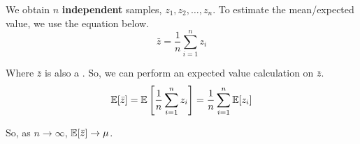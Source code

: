 We obtain $n$ \textbf{independent} samples, $z_{1}, z_{2}, \ldots, z_{n}$.
To estimate the mean/expected value, we use the equation below.
\begin{equation}\label{eq:Sample_Mean}
  \bar{z} = \frac{1}{n} \sum\limits_{i=1}^{n}z_{i}
\end{equation}

Where $\bar{z}$ is also a .
So, we can perform an expected value calculation on $\bar{z}$.
\begin{equation}\label{eq:Sample_Expected_Value}
  \operatorname{\operatorname{\mathbb{E}}}[\bar{z}] = \operatorname{\operatorname{\mathbb{E}}} \left[ \frac{1}{n} \sum\limits_{i=1}^{n} z_{i} \right] = \frac{1}{n} \sum\limits_{i=1}^{n} \operatorname{\operatorname{\mathbb{E}}}[z_{i}]
\end{equation}

So, as $n \rightarrow \infty$, $\operatorname{\operatorname{\mathbb{E}}}[\bar{z}] \rightarrow \mu$.

